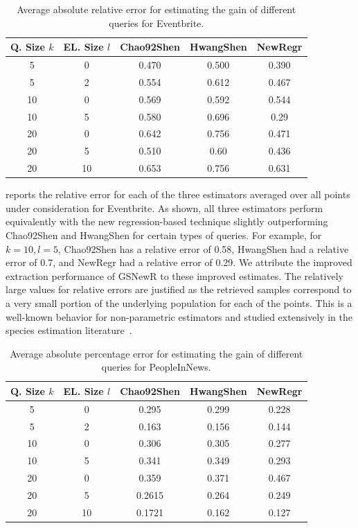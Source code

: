 \begin{table}[h]
\scriptsize \center
\vspace{-10pt}
\caption{Average absolute relative error for estimating the gain of different queries for Eventbrite.}
\label{tab:eventesterror}
\begin{tabular}{|c|c|c|c|c|}
\hline
\textbf{Q. Size $k$} & \textbf{EL. Size $l$} & \textbf{Chao92Shen} & \textbf{HwangShen} & \textbf{NewRegr} \\ \hline
5 & 0 & 0.470 & 0.500 & 0.390 \\
5 & 2 & 0.554 & 0.612 & 0.467\\
10 & 0 & 0.569 & 0.592 & 0.544\\
10 & 5 & 0.580 & 0.696 & 0.29\\
20 & 0 & 0.642 & 0.756 &0.471\\
20 & 5 & 0.510 & 0.60 & 0.436 \\
20 & 10 & 0.653 & 0.756 & 0.631\\
\hline
\end{tabular}
\end{table}


 reports the relative error for each of the three estimators averaged over all points under consideration for Eventbrite. As shown, all three estimators perform equivalently with the new regression-based technique slightly outperforming Chao92Shen and HwangShen for certain types of queries. For example, for $k = 10, l = 5$, Chao92Shen has a relative error of 0.58, HwangShen had a relative error of 0.7, and NewRegr had a relative error of 0.29. We attribute the improved extraction performance of GSNewR to these improved estimates. The relatively large values for relative errors are justified as the retrieved samples correspond to a very small portion of the underlying population for each of the points. This is a well-known behavior for non-parametric estimators and studied extensively in the species estimation literature~\cite{hwang:2010}. 

\begin{table}[h]
\scriptsize \center
\caption{Average absolute percentage error for estimating the gain of different queries for PeopleInNews.}
\label{tab:peopleesterror}
\begin{tabular}{|c|c|c|c|c|}
\hline
\textbf{Q. Size $k$} & \textbf{EL. Size $l$} & \textbf{Chao92Shen} & \textbf{HwangShen} & \textbf{NewRegr} \\ \hline
5 & 0 & 0.295 & 0.299 & 0.228\\
5 & 2 & 0.163 &  0.156 & 0.144\\
10 & 0 &  0.306 & 0.305 & 0.277\\
10 & 5 &  0.341 & 0.349 & 0.293\\
20 & 0 &  0.359& 0.371 & 0.467 \\
20 & 5 &  0.2615 & 0.264 & 0.249\\
20 & 10 & 0.1721 & 0.162 & 0.127\\
\hline
\end{tabular}
\end{table}

